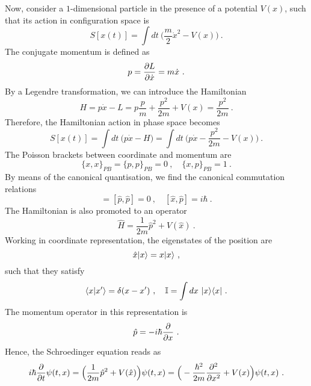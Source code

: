     Now, consider a $1$-dimensional particle in the presence of a potential $V(x)$, such that its action in configuration space is 
    \begin{equation*}
        S[x(t)] = \int dt ~ \Big ( \frac{m}{2} \dot x^2 - V(x) \Big) ~. 
    \end{equation*}
    The conjugate momentum is defined as 
    \begin{equation*}
        p = \frac{\partial L}{\partial\dot x} = m \dot x ~.
    \end{equation*}
    By a Legendre transformation, we can introduce the Hamiltonian 
    \begin{equation*}
        H = p \dot x - L = p \frac{p}{m} + \frac{p^2}{2m} + V(x) = \frac{p^2}{2m} ~.
    \end{equation*}
    Therefore, the Hamiltonian action in phase space becomes
    \begin{equation*}
        S[x(t)] = \int dt ~ \Big (p \dot x - H) = \int dt ~ \Big ( p \dot x - \frac{p^2}{2m} - V(x)) ~. 
    \end{equation*}
    The Poisson brackets between coordinate and momentum are 
    \begin{equation*}
        \{x,x\}_{PB} = \{p,p\}_{PB} = 0 ~, \quad \{x,p\}_{PB} = 1 ~.
    \end{equation*}
    By means of the canonical quantisation, we find the canonical commutation relations 
    \begin{equation*}
        [\hat x, \hat x] = [\hat p, \hat p] = 0 ~, \quad [\hat x, \hat p] = i \hbar ~.
    \end{equation*}
    The Hamiltonian is also promoted to an operator
    \begin{equation*}
        \hat H = \frac{1}{2m} \hat p^2 + V(\hat x) ~.
    \end{equation*}
    Working in coordinate representation, the eigenstates of the position are 
    \begin{equation*}
        \hat x \vert x\rangle = x \vert x\rangle ~,
    \end{equation*}
    such that they satisfy 
    \begin{equation*}
        \langle x\vert x'\rangle = \delta (x - x') ~, \quad \mathbb I = \int dx ~ \vert x\rangle \langle x\vert ~.
    \end{equation*}
    The momentum operator in this representation is 
    \begin{equation*}
        \hat p = - i \hbar \frac{\partial}{\partial x} ~.
    \end{equation*}
    Hence, the Schroedinger equation reads as
    \begin{equation*}
        i \hbar \frac{\partial}{\partial t} \psi(t,x) = \Big (\frac{1}{2m} \hat p^2 + V(\hat x) \Big ) \psi(t,x) = \Big (-\frac{\hbar^2}{2m} \frac{\partial^2 }{\partial x^2} + V(x) \Big) \psi(t,x) ~.
    \end{equation*}

